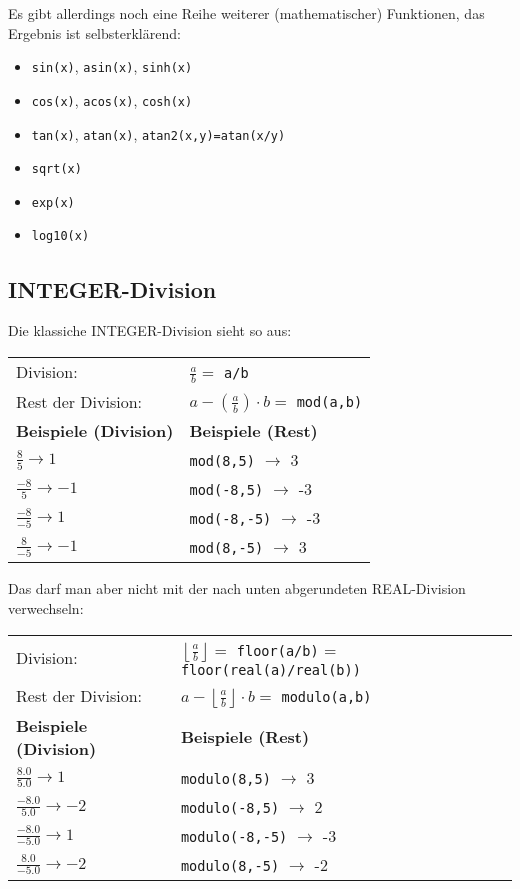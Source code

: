 Es gibt allerdings noch eine Reihe weiterer (mathematischer) Funktionen, das Ergebnis ist selbsterklärend:
\begin{itemize}
	\item\texttt{sin(x)}, \texttt{asin(x)}, \texttt{sinh(x)}
	\item\texttt{cos(x)}, \texttt{acos(x)}, \texttt{cosh(x)}
	\item\texttt{tan(x)}, \texttt{atan(x)}, \texttt{atan2(x,y)=atan(x/y)}
	\item\texttt{sqrt(x)}
	\item\texttt{exp(x)}
	\item\texttt{log10(x)}
\end{itemize}

\subsection{INTEGER-Division}

Die klassiche INTEGER-Division sieht so aus:
\begin{center}
	\begin{tabular}{ll}
		Division: & $\frac{a}{b} =$ \texttt{a/b} \\
		Rest der Division: & $a-\left(\frac{a}{b}\right)\cdot b =$ \texttt{mod(a,b)} \\
		\hline
		\textbf{Beispiele (Division)} & \textbf{Beispiele (Rest)} \\
		\hline
		$\frac{8}{5} \to 1$ & \texttt{mod(8,5)} $\to$ 3 \\
		$\frac{-8}{5} \to -1$ & \texttt{mod(-8,5)} $\to$ -3 \\
		$\frac{-8}{-5} \to 1$ & \texttt{mod(-8,-5)} $\to$ -3 \\
		$\frac{8}{-5} \to -1$ & \texttt{mod(8,-5)} $\to$ 3
	\end{tabular}
\end{center}

Das darf man aber nicht mit der nach unten abgerundeten REAL-Division verwechseln:
\begin{center}
	\begin{tabular}{ll}
		Division: & $\left\lfloor\frac{a}{b}\right\rfloor =$ \texttt{floor(a/b)} = \texttt{floor(real(a)/real(b))} \\
		Rest der Division: & $a-\left\lfloor\frac{a}{b}\right\rfloor\cdot b =$ \texttt{modulo(a,b)} \\
		\hline
		\textbf{Beispiele (Division)} & \textbf{Beispiele (Rest)} \\
		\hline
		$\frac{8.0}{5.0} \to 1$ & \texttt{modulo(8,5)} $\to$ 3 \\
		$\frac{-8.0}{5.0} \to -2$ & \texttt{modulo(-8,5)} $\to$ 2 \\
		$\frac{-8.0}{-5.0} \to 1$ & \texttt{modulo(-8,-5)} $\to$ -3 \\
		$\frac{8.0}{-5.0} \to -2$ & \texttt{modulo(8,-5)} $\to$ -2
	\end{tabular}
\end{center}

